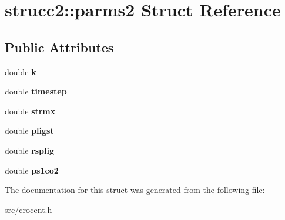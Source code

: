 \hypertarget{structstrucc2_1_1parms2}{\section{strucc2\-:\-:parms2 Struct Reference}
\label{structstrucc2_1_1parms2}
}
\subsection*{Public Attributes}
\begin{DoxyCompactItemize}
\item 
\hypertarget{structstrucc2_1_1parms2_a3ada66a26860a18837822423d2d784ba}{double {\bfseries k}}\label{structstrucc2_1_1parms2_a3ada66a26860a18837822423d2d784ba}

\item 
\hypertarget{structstrucc2_1_1parms2_a38e0c376885cbc6262b3de6a9b85dbfc}{double {\bfseries timestep}}\label{structstrucc2_1_1parms2_a38e0c376885cbc6262b3de6a9b85dbfc}

\item 
\hypertarget{structstrucc2_1_1parms2_a5f4d46df5d39e7c2b3e6e967d1aa0d98}{double {\bfseries strmx}}\label{structstrucc2_1_1parms2_a5f4d46df5d39e7c2b3e6e967d1aa0d98}

\item 
\hypertarget{structstrucc2_1_1parms2_ae3de95268ac826ebdb2428eeaad6c34c}{double {\bfseries pligst}}\label{structstrucc2_1_1parms2_ae3de95268ac826ebdb2428eeaad6c34c}

\item 
\hypertarget{structstrucc2_1_1parms2_a9181ddf11b23ae698b55c7b1399fb392}{double {\bfseries rsplig}}\label{structstrucc2_1_1parms2_a9181ddf11b23ae698b55c7b1399fb392}

\item 
\hypertarget{structstrucc2_1_1parms2_a274b4dbaa1e2f8df2e9eb4d0cf99df6c}{double {\bfseries ps1co2}}\label{structstrucc2_1_1parms2_a274b4dbaa1e2f8df2e9eb4d0cf99df6c}

\end{DoxyCompactItemize}


The documentation for this struct was generated from the following file\-:\begin{DoxyCompactItemize}
\item 
src/crocent.\-h\end{DoxyCompactItemize}

